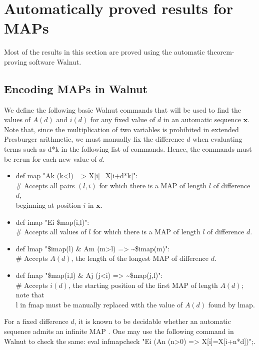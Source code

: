 \documentclass[10pt,a4paper,reqno]{amsart}
\newcommand{\bfx}{{\mathbf x}}
\newcommand{\walnut}{{\ttfamily Walnut}}
\begin{document}
\section{Automatically proved results for MAPs}\label{SEC:results-walnut}
Most of the results in this section are proved using the automatic theorem-proving software \walnut{}.

\subsection{Encoding MAPs in \walnut{}}\label{fixdalgo}
We define the following basic \walnut{} commands that will be used to find the values of $A(d)$ and $i(d)$ for any fixed value of $d$ in an automatic sequence $\bfx$.  Note that, since the multiplication of two variables is prohibited in extended Presburger arithmetic, we must manually fix the difference $d$ when evaluating terms such as {\ttfamily d*k} in the following list of commands. Hence, the commands must be rerun for each new value of $d$.
\begin{itemize}
\item {\ttfamily def map "Ak (k<l) => X[i]=X[i+d*k]":
\\\# Accepts all pairs $(l,i)$ for which there is a MAP of length $l$ of difference $d$,\\ beginning at position $i$ in $\bfx$.}
\item {\ttfamily def imap "Ei \$map(i,l)":\\\# Accepts all values of $l$ for which there is a MAP of length $l$ of difference $d$.}
\item {\ttfamily def lmap "\$imap(l) \& Am (m>l) => \textasciitilde\$imap(m)":\\\# Accepts $A(d)$, the length of the longest MAP of difference $d$.}
\item {\ttfamily def fmap "\$map(i,l) \& Aj (j<i) => \textasciitilde\$map(j,l)":\\\# Accepts $i(d)$, the starting position of the first MAP of length $A(d)$; note that\\ {\ttfamily l} in {\ttfamily fmap} must be manually replaced with the value of $A(d)$ found by {\ttfamily lmap}.}
\end{itemize}

\begin{rem}
    For a fixed difference $d$, it is known to be decidable whether an automatic sequence admits an infinite MAP \cite[Proposition 22]{dg2019}. One may use the following command in {\walnut} to check the same: {\ttfamily eval infmapcheck "Ei (An (n>0) => X[i]=X[i+n*d])";}.
\end{rem}
\end{document}
